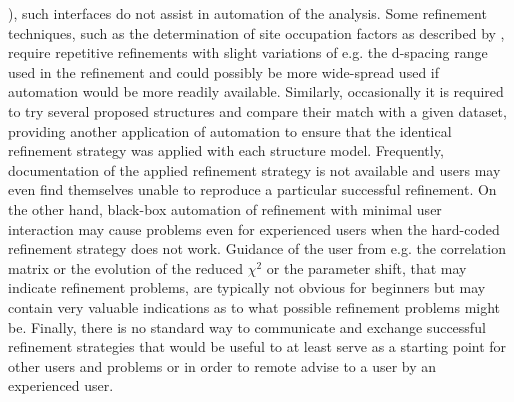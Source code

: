 \cite{toby2001expgui}), such interfaces do not assist in automation of the analysis. Some refinement techniques, such as the determination of site occupation factors as described by \cite{heuer2001determination}, require repetitive refinements with slight variations of e.g. the d-spacing range used in the refinement and could possibly be more wide-spread used if automation would be more readily available. Similarly, occasionally it is required to try several proposed structures and compare their match with a given dataset, providing another application of automation to ensure that the identical refinement strategy was applied with each structure model. Frequently, documentation of the applied refinement strategy is not available and users may even find themselves unable to reproduce a particular successful refinement. On the other hand, black-box automation of refinement with minimal user interaction may cause problems even for experienced users when the hard-coded refinement strategy does not work. Guidance of the user from e.g. the correlation matrix or the evolution of the reduced $\chi^2$ or the parameter shift, that may indicate refinement problems, are typically not obvious for beginners but may contain very valuable indications as to what possible refinement problems might be. Finally, there is no standard way to communicate and exchange successful refinement strategies that would be useful to at least serve as a starting point for other users and problems or in order to remote advise to a user by an experienced user.

